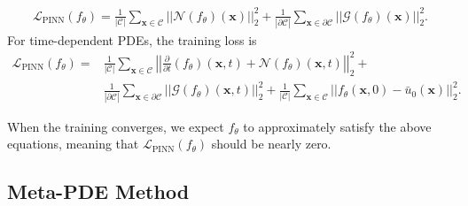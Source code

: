 \begin{align}\label{eq:pinn_training_loss}
    \mathcal{L}_{\text{PINN}}(f_\theta) = \frac{1}{|\mathcal{C}|} \sum_{\bm{x} \in \mathcal{C}} \left|\left| \mathcal{N} (f_{\theta})(\bm{x}) \right|\right|_2^2  + \frac{1}{|\partial \mathcal{C}|}  \sum_{{\bm{x} \in \mathcal{\partial \mathcal{C}}} } \left|\left|\mathcal{G}(f_{\theta})(\bm{x})\right|\right|_2^2.
\end{align}
For time-dependent PDEs, the training loss is
\begin{align}\label{eq:pinn_training_loss}
    \mathcal{L}_{\text{PINN}}(f_\theta) = & \frac{1}{|\mathcal{C}|} \sum_{\bm{x} \in \mathcal{C}}\left|\left| \frac{\partial}{\partial t}(f_\theta)(\bm{x}, t) + \mathcal{N} (f_{\theta})(\bm{x}, t) \right|\right|_2^2  +\\ 
     & \frac{1}{|\partial \mathcal{C}|}  \sum_{{\bm{x} \in \mathcal{\partial \mathcal{C}}} } \left|\left|\mathcal{G}(f_{\theta})(\bm{x}, t)\right|\right|_2^2 + \frac{1}{|\mathcal{C}|} \sum_{\bm{x} \in \mathcal{C}} \left|\left| f_{\theta}(\bm{x}, 0) - \bar{u}_0(\bm{x}) \right|\right| _2^2.
\end{align}

When the training converges, we expect $f_{\theta}$ to approximately satisfy the above equations, meaning that $\mathcal{L}_{\text{PINN}}(f_\theta)$ should be nearly zero.

\subsection{Meta-PDE Method}


